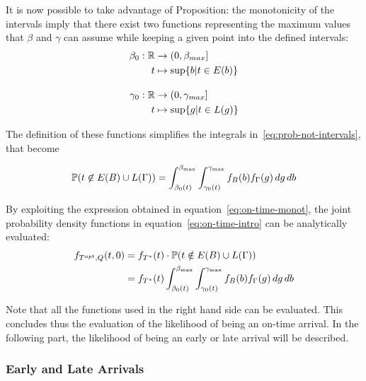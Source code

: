 It is now possible to take advantage of Proposition:
the monotonicity of the intervals imply that there exist two functions representing the maximum values that \(\beta\) and \(\gamma\) can assume while keeping a given point into the defined intervals:
\begin{equation}
  \label{eq:def_b_0_g_0}
  \begin{split}
    \beta_0:\mathbb{R}&\rightarrow(0, \beta_{max}] \\
    t&\mapsto \sup\{b | t \in E(b)\} \\[1em]
    \gamma_0:\mathbb{R}&\rightarrow(0, \gamma_{max}] \\
    t&\mapsto \sup\{g | t \in L(g)\}
  \end{split}
\end{equation}

The definition of these functions simplifies the integrals in~\eqref{eq:prob-not-intervals}, that become

\begin{equation}
  \label{eq:on-time-monot}
  \mathbb{P}( t \not\in E(B) \cup L(\Gamma)) = \int_{\beta_0(t)}^{\beta_{\text{max}}}\int_{\gamma_0(t)}^{\gamma_{\text{max}}}f_B(b)f_\Gamma(g)\, dg\, db
\end{equation}

By exploiting the expression obtained in equation~\eqref{eq:on-time-monot},
the joint probability density functions in equation~\eqref{eq:on-time-intro} can be analytically evaluated:
\begin{equation}
  \label{eq:on-time-final}
  \begin{split}
    f_{T^{opt}, Q}(t, 0) & = f_{T^*}(t) \cdot \mathbb{P}(t \notin E(B) \cup L(\Gamma)) \\
    & = f_{T^*}(t)\int_{\beta_0(t)}^{\beta_{\text{max}}}\int_{\gamma_0(t)}^{\gamma_{\text{max}}}f_B(b)f_\Gamma(g)\, dg\, db
  \end{split}
\end{equation}

Note that all the functions used in the right hand side can be evaluated.
This concludes thus the evaluation of the likelihood of being an on-time arrival.
In the following part, the likelihood of being an early or late arrival will be described.

\subsubsection{Early and Late Arrivals}

